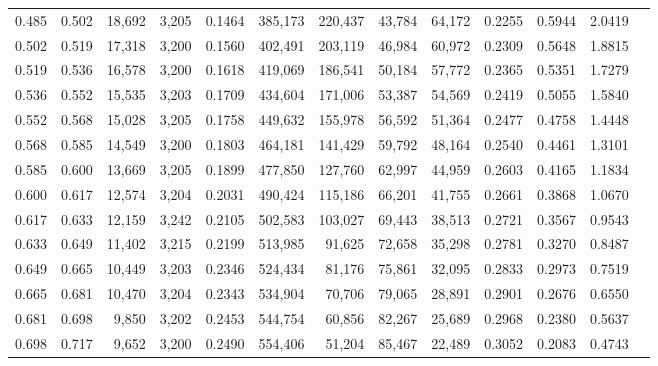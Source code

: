 \begin{tabular}{rrrrrrrrrrrrr}
0.485 & 0.502 & 18,692 & 3,205 &                                     0.1464 & 385,173 & 220,437 &  43,784 &  64,172 & 0.2255 & 0.5944 & 2.0419 \\
0.502 & 0.519 & 17,318 & 3,200 &                                     0.1560 & 402,491 & 203,119 &  46,984 &  60,972 & 0.2309 & 0.5648 & 1.8815 \\
0.519 & 0.536 & 16,578 & 3,200 &                                     0.1618 & 419,069 & 186,541 &  50,184 &  57,772 & 0.2365 & 0.5351 & 1.7279 \\
0.536 & 0.552 & 15,535 & 3,203 &                                     0.1709 & 434,604 & 171,006 &  53,387 &  54,569 & 0.2419 & 0.5055 & 1.5840 \\
0.552 & 0.568 & 15,028 & 3,205 &                                     0.1758 & 449,632 & 155,978 &  56,592 &  51,364 & 0.2477 & 0.4758 & 1.4448 \\
0.568 & 0.585 & 14,549 & 3,200 &                                     0.1803 & 464,181 & 141,429 &  59,792 &  48,164 & 0.2540 & 0.4461 & 1.3101 \\
0.585 & 0.600 & 13,669 & 3,205 &                                     0.1899 & 477,850 & 127,760 &  62,997 &  44,959 & 0.2603 & 0.4165 & 1.1834 \\
0.600 & 0.617 & 12,574 & 3,204 &                                     0.2031 & 490,424 & 115,186 &  66,201 &  41,755 & 0.2661 & 0.3868 & 1.0670 \\
0.617 & 0.633 & 12,159 & 3,242 &                                     0.2105 & 502,583 & 103,027 &  69,443 &  38,513 & 0.2721 & 0.3567 & 0.9543 \\
0.633 & 0.649 & 11,402 & 3,215 &                                     0.2199 & 513,985 &  91,625 &  72,658 &  35,298 & 0.2781 & 0.3270 & 0.8487 \\
0.649 & 0.665 & 10,449 & 3,203 &                                     0.2346 & 524,434 &  81,176 &  75,861 &  32,095 & 0.2833 & 0.2973 & 0.7519 \\
0.665 & 0.681 & 10,470 & 3,204 &                                     0.2343 & 534,904 &  70,706 &  79,065 &  28,891 & 0.2901 & 0.2676 & 0.6550 \\
0.681 & 0.698 &  9,850 & 3,202 &                                     0.2453 & 544,754 &  60,856 &  82,267 &  25,689 & 0.2968 & 0.2380 & 0.5637 \\
0.698 & 0.717 &  9,652 & 3,200 &                                     0.2490 & 554,406 &  51,204 &  85,467 &  22,489 & 0.3052 & 0.2083 & 0.4743 \\

\end{tabular}
